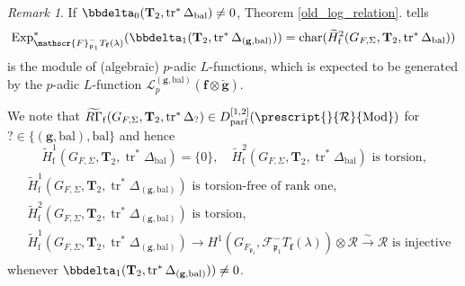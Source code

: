 \documentclass[10pt]{amsart}
\numberwithin{equation}{section}
\theoremstyle{definition}
\theoremstyle{remark} %
\newtheorem{rmk}[thm]{Remark}
\newcommand{\scr}{\mathscr}
\DeclareMathOperator{\Char}{char}
\newcommand{\Exp}{\operatorname{Exp}}
\DeclareMathOperator{\tr}{{tr}^*}
\renewcommand{\b}{\mathrm{bal}}
\newcommand{\f}{\mathbf{f}}
\newcommand{\scrF}{\mathscr{F}}
\newcommand{\g}{\mathbf{g}}
\newcommand{\p}{\mathfrak{p}}
\newcommand{\R}{\mathcal{R}}
\newcommand{\T}{\mathbf{T}}
\begin{document}
		\begin{rmk} \label{rmk : Exp_T2_rank1}
			If $ \bbdelta_0(\T_2, \operatorname{tr}^*\Delta_{\mathrm{bal}}) \ne 0 $, Theorem \ref{old_log_relation}. tells 
			\begin{equation}
				\Exp^*_{\scrF^-_{\p_1} T_{\f}(\lambda)} (\bbdelta_1(\T_{2}, \tr \Delta_{(\g,\b)})) = \Char(\widetilde{H}^2_{\mathrm{f}}(G_{F,\Sigma}, \T_2, \operatorname{tr}^*\Delta_{\mathrm{bal}}))
			\end{equation}
			is the module of (algebraic) $ p $-adic $ L $-functions, which is expected to be generated by the $ p $-adic $ L $-function $ \scr{L}_p^{(\g,\b)}(\f \otimes \breve{\g} ) $. 
		\end{rmk}
		We note that $\widetilde{R\Gamma}_{\mathrm{f}}(G_{F,\Sigma},\T_2, \operatorname{tr}^*\Delta_?) \in D_{\mathrm{parf}}^{[1,2]}(\prescript{}{\R}{\mathrm{Mod}}) $ for $? \in \{(\g, \b), \b\} $ and hence 
		\begin{equation}
			\widetilde{H}^1_{\mathrm{f}}(G_{F,\Sigma}, \T_2, \operatorname{tr}^*\Delta_{\mathrm{bal}}) = \{0\}, \quad \widetilde{H}^2_{\mathrm{f}}(G_{F,\Sigma}, \T_2, \operatorname{tr}^*\Delta_{\mathrm{bal}}) \text{ is torsion,}
		\end{equation}
		\begin{align}
			\begin{aligned}
				&\widetilde{H}^1_{\mathrm{f}}(G_{F,\Sigma}, \T_2, \operatorname{tr}^*\Delta_{(\g,\b)}) \text{ is torsion-free of rank one,} \\ 
				&\widetilde{H}^2_{\mathrm{f}}(G_{F,\Sigma}, \T_2, \operatorname{tr}^*\Delta_{(\g,\b)}) \text{ is torsion,} \\
				&\widetilde{H}^1_{\mathrm{f}}(G_{F,\Sigma}, \T_2, \operatorname{tr}^*\Delta_{(\g,\b)})\rightarrow H^1(G_{F_{\p_1}},\scrF^-_{\p_1} T_{\f}(\lambda)) \otimes \R \xrightarrow{\sim} \R \text{ is injective}
			\end{aligned}
		\end{align}
		whenever $  \bbdelta_1(\T_{2}, \tr \Delta_{(\g,\b)})) \ne 0 $.
		
		
\end{document}
